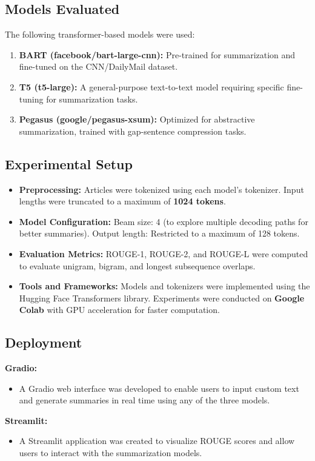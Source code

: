 \documentclass[a4paper,12pt]{article}
\begin{document}
\subsection{Models Evaluated}
The following transformer-based models were used:
\begin{enumerate}
    \item \textbf{BART (facebook/bart-large-cnn):} Pre-trained for summarization and fine-tuned on the CNN/DailyMail dataset.
    \item \textbf{T5 (t5-large):} A general-purpose text-to-text model requiring specific fine-tuning for summarization tasks.
    \item \textbf{Pegasus (google/pegasus-xsum):} Optimized for abstractive summarization, trained with gap-sentence compression tasks.
\end{enumerate}

\subsection{Experimental Setup}
\begin{itemize}
    \item \textbf{Preprocessing:} Articles were tokenized using each model’s tokenizer. Input lengths were truncated to a maximum of \textbf{1024 tokens}.
    \item \textbf{Model Configuration:} Beam size: 4 (to explore multiple decoding paths for better summaries). Output length: Restricted to a maximum of 128 tokens.
    \item \textbf{Evaluation Metrics:} ROUGE-1, ROUGE-2, and ROUGE-L were computed to evaluate unigram, bigram, and longest subsequence overlaps.
    \item \textbf{Tools and Frameworks:} Models and tokenizers were implemented using the Hugging Face Transformers library. Experiments were conducted on \textbf{Google Colab} with GPU acceleration for faster computation.
\end{itemize}

\subsection{Deployment}
\textbf{Gradio:}
\begin{itemize}
    \item A Gradio web interface was developed to enable users to input custom text and generate summaries in real time using any of the three models.
\end{itemize}
\textbf{Streamlit:}
\begin{itemize}
    \item A Streamlit application was created to visualize ROUGE scores and allow users to interact with the summarization models. 
\end{itemize}
\end{document}
